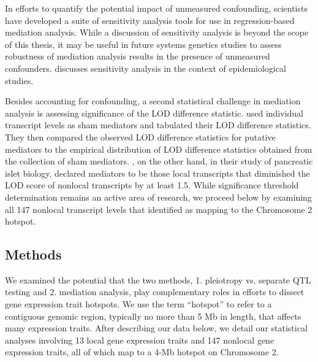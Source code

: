 \documentclass[oneside]{book}\usepackage[]{graphicx}\usepackage[]{color}
\begin{document}
In efforts to quantify the potential impact of unmeasured confounding, scientists have 
developed a suite of sensitivity analysis tools for use in regression-based mediation analysis.
While a discussion of sensitivity analysis is beyond the scope of this thesis, 
it may be useful in future systems genetics studies to assess robustness of mediation analysis
results in the presence of unmeasured confounders. 
\citet{vanderweele2015explanation} discusses sensitivity analysis in the context of epidemiological studies. 








Besides accounting for confounding, a second statistical challenge in mediation analysis is assessing significance of the LOD difference statistic. 
\citet{chick2016defining} used individual transcript levels as sham mediators and tabulated their LOD difference statistics. 
They then compared the observed LOD difference statistics for putative mediators to the empirical distribution of LOD difference statistics obtained from the collection of sham mediators. 
\citet{keller2018genetic}, on the other hand, in their study of pancreatic islet 
biology, declared mediators to be those local transcripts that diminished the LOD score 
of nonlocal transcripts by at least 1.5. 
While significance threshold determination remains an active area of research, 
we proceed below by examining all 147 nonlocal transcript levels that 
\citet{keller2018genetic} identified as mapping to the Chromosome 2 hotspot.



\subsection{Methods}

We examined the potential that the two methods, 1. pleiotropy vs. separate QTL testing and 
2. mediation analysis, play complementary roles in efforts to dissect gene expression trait hotspots. 
We use the term ``hotspot'' to refer to a contiguous genomic region, 
typically no more than 5 Mb in length, that affects many expression traits.
After describing our data below, we detail our statistical analyses involving 13 local 
gene expression traits and 147 nonlocal gene expression traits, 
all of which map to a 4-Mb hotspot on Chromosome 2.
\end{document}
